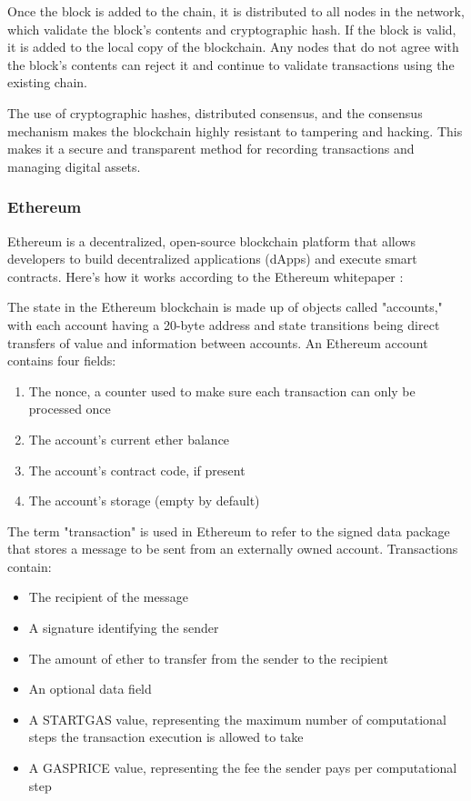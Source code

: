 \documentclass{article}
\begin{document}
Once the block is added to the chain, it is distributed to all nodes in the network, which validate the block's contents and cryptographic hash. If the block is valid, it is added to the local copy of the blockchain. Any nodes that do not agree with the block's contents can reject it and continue to validate transactions using the existing chain.

The use of cryptographic hashes, distributed consensus, and the consensus mechanism makes the blockchain highly resistant to tampering and hacking. This makes it a secure and transparent method for recording transactions and managing digital assets.

\subsubsection{Ethereum}
Ethereum is a decentralized, open-source blockchain platform that allows developers to build decentralized applications (dApps) and execute smart contracts. Here's how it works according to the Ethereum whitepaper \cite{ethereumWhitepaper}:

The state in the Ethereum blockchain is made up of objects called "accounts," with each account having a 20-byte address and state transitions being direct transfers of value and information between accounts. An Ethereum account contains four fields:
\begin{enumerate}
    \item The nonce, a counter used to make sure each transaction can only be processed once
    \item The account's current ether balance
    \item The account's contract code, if present
    \item The account's storage (empty by default)
\end{enumerate}

The term "transaction" is used in Ethereum to refer to the signed data package that stores a message to be sent from an externally owned account. Transactions contain:

\begin{itemize}
    \item The recipient of the message
    \item A signature identifying the sender
    \item The amount of ether to transfer from the sender to the recipient
    \item An optional data field
    \item A STARTGAS value, representing the maximum number of computational steps the transaction execution is allowed to take
    \item A GASPRICE value, representing the fee the sender pays per computational step
\end{itemize}
\end{document}
